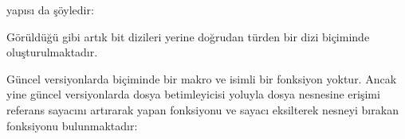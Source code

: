 \documentclass[a4paper,10pt,turkish]{sphinxmanual}
\begin{document}
\sphinxAtStartPar
{} yapısı da şöyledir:

\begin{sphinxVerbatim}[commandchars=\\\{\}]
\end{sphinxVerbatim}

\sphinxAtStartPar
Görüldüğü gibi artık bit dizileri  yerine doğrudan  türden bir dizi
biçiminde oluşturulmaktadır.

\sphinxAtStartPar
Güncel versiyonlarda  biçiminde bir makro ve  isimli bir fonksiyon
yoktur. Ancak yine güncel versiyonlarda dosya betimleyicisi yoluyla dosya nesnesine erişimi
referans sayacını artırarak yapan  fonksiyonu ve sayacı eksilterek nesneyi bırakan
 fonksiyonu bulunmaktadır:

\begin{sphinxVerbatim}[commandchars=\\\{\}]
\end{sphinxVerbatim}
\end{document}

